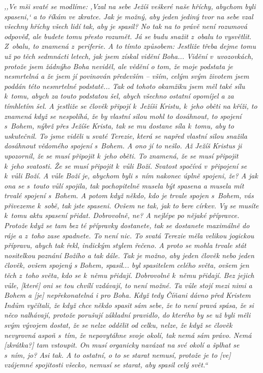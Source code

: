 \begin{enumerate}
{%
\textit{%
,,Ve mši svaté se modlíme: ,Vzal na sebe Ježíš veškeré naše hříchy, abychom byli
spaseni,` a to říkám ve zkratce. Jak je možný, aby jeden jediný tvor na sebe
vzal všechny hříchy všech lidí tak, aby je spasil? No tak na to právě není
rozumová odpověď, ale budete tomu přesto rozumět. Já se budu snažit z~obalu to
vysvětlit. Z~obalu, to znamená z~periferie. A to tímto způsobem: Jestliže třeba
dejme tomu už po těch sedmnácti letech, jak jsem získal vidění Boha... Vidění
v~uvozovkách, protože jsem žádnýho Boha neviděl, ale vědění o tom, že moje
podstata je nesmrtelná a že jsem jí povinován především -- vším, celým svým
životem jsem poddán této nesmrtelné podstatě... Tak od tohoto okamžiku jsem měl
také sílu k~tomu, abych za touto podstatou šel, abych všechno ostatní opomíjel a
za tímhletím šel. A jestliže se člověk připojí k~Ježíši Kristu, k~jeho oběti na
kříži, to znamená když se nespolíhá, že by vlastní silou mohl to dosáhnout, to
spojení s~Bohem, nýbrž přes Ježíše Krista, tak se mu dostane síla k~tomu, aby to
uskutečnil. To jsme viděli u svaté Terezie, která se napřed vlastní silou
snažila dosáhnout vědomého spojení s~Bohem. A ono jí to nešlo. Až Ježíš Kristus
ji upozornil, že se musí připojit k~jeho oběti. To znamená, že se musí připojit
k~jeho svatosti. Že se musí připojit k~vůli Boží. Svatost spočívá v~připojení se
k~vůli Boží. A vůle Boží je, abychom byli s~ním nakonec úplně spojeni, že? A jak
ona se s~touto vůlí spojila, tak pochopitelně musela být spasena a musela mít
trvalé spojení s~Bohem. A potom když někdo, kdo je trvale spojen s~Bohem, vás
přivezeme k~sobě, tak jste spaseni. Ovšem ne tak, jak to bere církev. Vy se
musíte k~tomu aktu spasení přidat. Dobrovolně, ne? A nejlépe po nějaké přípravce.
Protože když se tam bez té přípravky dostanete, tak se dostanete maximálně do
ráje a z~toho zase spadnete. To není nic. To svatá Terezie měla velikou jogickou
přípravu, abych tak řekl, indickým stylem řečeno. A proto se mohla trvale stát
nositelkou poznání Božího a tak dále. Tak je možno, aby jeden člověk nebo jeden
člověk, ovšem spojený s Bohem, spasil... byl spasitelem celého světa, ovšem jen
těch z~toho světa, kdo se k~němu přidají. Dobrovolně k~němu přidají. Bez jejich
vůle, [které] oni se tou chvílí vzdávají, to není možné. Ta vůle stojí mezi nimi
a Bohem a [je] nepřekonatelná i pro Boha. Když tedy Číňani dávno před Kristem
Indům vyčítali, že když chce někdo spasit sám sebe, že to není pravá spása, že
si něco nalhávají, protože porušují základní pravidlo, do kterého by se už byli
měli svým vývojem dostat, že se nelze oddělit od celku, nelze, že když se člověk
nevyrovná aspoň s~tím, že nepovytáhne svoje okolí, tak nemá sám právo. Nemá
[zkrátka?] tam vstoupit. On musí organicky navázat na své okolí a šplhat se
s~ním, jo? Asi tak. A to ostatní, o to se starat nemusí, protože je to [ve]
vzájemné spojitosti všecko, nemusí se starat, aby spasil celý svět.``
}
}

\end{enumerate}

